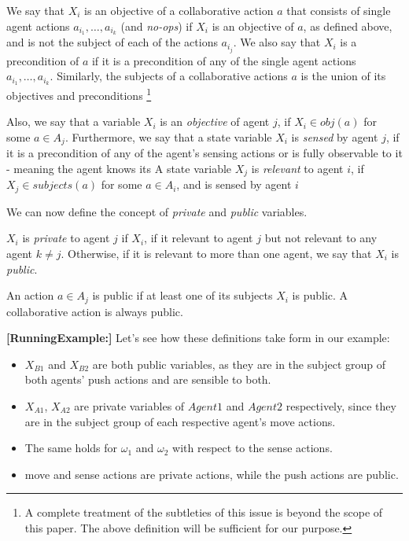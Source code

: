 \documentclass[letterpaper]{article} %
\newcommand{\eliran}[1]{\textbf{[\color{red}ELIRAN:#1]}}
\newcommand{\RE}[1]{\textbf{[\color{purple}RunningExample:#1]}}
\begin{document}
We say that $X_i$ is an objective of a collaborative action $a$ that consists of single agent actions
$a_{i_1},\ldots,a_{i_k}$ (and {\em no-ops}) if $X_i$ is an objective of $a$, as defined above, and is not the subject of each of the actions $a_{i_j}$.
We also say that $X_i$ is a precondition of $a$ if it is a precondition of any of the single agent actions $a_{i_1},\ldots,a_{i_k}$.
Similarly, the subjects of a collaborative actions $a$ is the union of its objectives and preconditions%
\footnote{A complete treatment of the subtleties of this issue is beyond the scope of this paper. The above definition will be sufficient for our purpose.}

Also, we say that a variable $X_i$ is an \emph{objective} of agent $j$, if  $X_i\in obj(a)$ for some $a\in A_j$.
Furthermore, we say that a state variable $X_i$ is \emph{sensed} by agent $j$, if it is a precondition of any of the agent's sensing actions or is fully observable to it - meaning the agent knows its 
A state variable $X_j$ is \emph{relevant} to agent $i$, if $X_j\in subjects(a)$ for some $a\in A_i$, and is sensed by agent $i$

We can now define the concept of {\em private} and {\em public} variables.

$X_i$ is {\em private} to agent $j$ if $X_i$, if it relevant to agent $j$ but not relevant to any agent $k\neq j$.
Otherwise, if it is relevant to more than one agent, we say that $X_i$ is {\em public}. 

An action $a\in A_j$ is public if at least one of its subjects $X_i$ is public. A collaborative action is always public.

\RE{}
Let's see how these definitions take form in our example:
\begin{itemize}
    \item $X_{B1}$ and $X_{B2}$ are both public variables, as they are in the subject group of both agents' push actions and are sensible to both.
    \item $X_{A1}$, $X_{A2}$ are private variables of $Agent1$ and $Agent2$ respectively, since they are in the subject group of each respective agent's move actions.
    \item The same holds for $\omega_1$ and $\omega_2$ with respect to the sense actions.
    \item move and sense actions are private actions, while the push actions are public.
\end{itemize}
\end{document}
